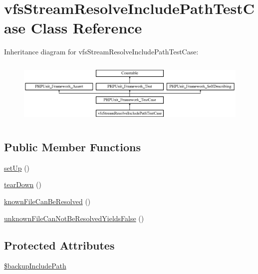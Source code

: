 \hypertarget{classorg_1_1bovigo_1_1vfs_1_1vfs_stream_resolve_include_path_test_case}{}\section{vfs\+Stream\+Resolve\+Include\+Path\+Test\+Case Class Reference}
\label{classorg_1_1bovigo_1_1vfs_1_1vfs_stream_resolve_include_path_test_case}
Inheritance diagram for vfs\+Stream\+Resolve\+Include\+Path\+Test\+Case\+:\begin{figure}[H]
\begin{center}
\leavevmode
\includegraphics[height=3.124128cm]{classorg_1_1bovigo_1_1vfs_1_1vfs_stream_resolve_include_path_test_case}
\end{center}
\end{figure}
\subsection*{Public Member Functions}
\begin{DoxyCompactItemize}
\item 
\mbox{\hyperlink{classorg_1_1bovigo_1_1vfs_1_1vfs_stream_resolve_include_path_test_case_a0bc688732d2b3b162ffebaf7812e78da}{set\+Up}} ()
\item 
\mbox{\hyperlink{classorg_1_1bovigo_1_1vfs_1_1vfs_stream_resolve_include_path_test_case_a80fe3d17e658907fc75346a0ec9d6fc7}{tear\+Down}} ()
\item 
\mbox{\hyperlink{classorg_1_1bovigo_1_1vfs_1_1vfs_stream_resolve_include_path_test_case_a31a58aae2058f963cd7a83c1e5289373}{known\+File\+Can\+Be\+Resolved}} ()
\item 
\mbox{\hyperlink{classorg_1_1bovigo_1_1vfs_1_1vfs_stream_resolve_include_path_test_case_a9b6d66a8201589c600aa170d9d47cbbc}{unknown\+File\+Can\+Not\+Be\+Resolved\+Yields\+False}} ()
\end{DoxyCompactItemize}
\subsection*{Protected Attributes}
\begin{DoxyCompactItemize}
\item 
\mbox{\hyperlink{classorg_1_1bovigo_1_1vfs_1_1vfs_stream_resolve_include_path_test_case_a70c34074e989434b28f6c87820346e53}{\$backup\+Include\+Path}}
\end{DoxyCompactItemize}
